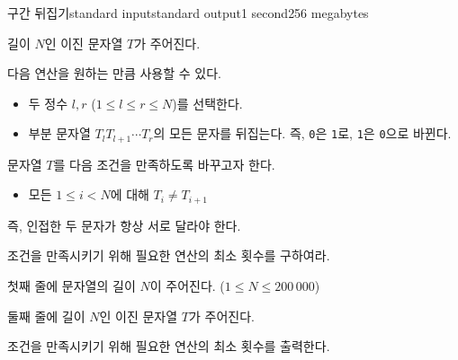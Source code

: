 \begin{problem}{구간 뒤집기}{standard input}{standard output}{1 second}{256 megabytes}

길이 $N$인 이진 문자열 $T$가 주어진다.

다음 연산을 원하는 만큼 사용할 수 있다.

\begin{itemize}
    \item 두 정수 $l, r$ ($1 \le l \le r \le N$)를 선택한다.
    \item 부분 문자열 $T_l T_{l+1} \cdots T_r$의 모든 문자를 뒤집는다.
    즉, \texttt{0}은 \texttt{1}로, \texttt{1}은 \texttt{0}으로 바뀐다.
\end{itemize}

문자열 $T$를 다음 조건을 만족하도록 바꾸고자 한다.

\begin{itemize}
    \item 모든 $1 \le i < N$에 대해 $T_i \ne T_{i+1}$
\end{itemize}

즉, 인접한 두 문자가 항상 서로 달라야 한다.

조건을 만족시키기 위해 필요한 연산의 최소 횟수를 구하여라.


\InputFile
첫째 줄에 문자열의 길이 $N$이 주어진다. ($1 \le N \le 200\,000$)

둘째 줄에 길이 $N$인 이진 문자열 $T$가 주어진다.

\OutputFile
조건을 만족시키기 위해 필요한 연산의 최소 횟수를 출력한다.

\Examples

\begin{example}
%
%
\end{example}

\end{problem}

